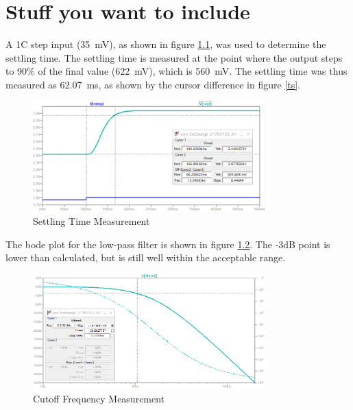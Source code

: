      \chapter{Stuff you want to include}

A 1\degree C step input (\SI{35}{\milli\volt}), as shown in figure \ref{fig:ts}, was used to determine the settling time. The settling time is measured at the point where the output steps to 90\% of the final value (\SI{622}{\milli\volt}), which is \SI{560}{\milli\volt}. The settling time was thus measured as \SI{62.07}{ms}, as shown by the cursor difference in figure \ref{ts}.
\begin{figure}[h]
    \centering
    \includegraphics[width = 0.8\textwidth]{Figures/ts.png}
    \caption{Settling Time Measurement}
    \label{fig:ts}
\end{figure}

The bode plot for the low-pass filter is shown in figure \ref{fig:ac}. The -3dB point is lower than calculated, but is still well within the acceptable range. 
\begin{figure}[h]
    \centering
    \includegraphics[width = 0.8\textwidth]{Figures/ac.png}
    \caption{Cutoff Frequency Measurement}
    \label{fig:ac}
\end{figure}